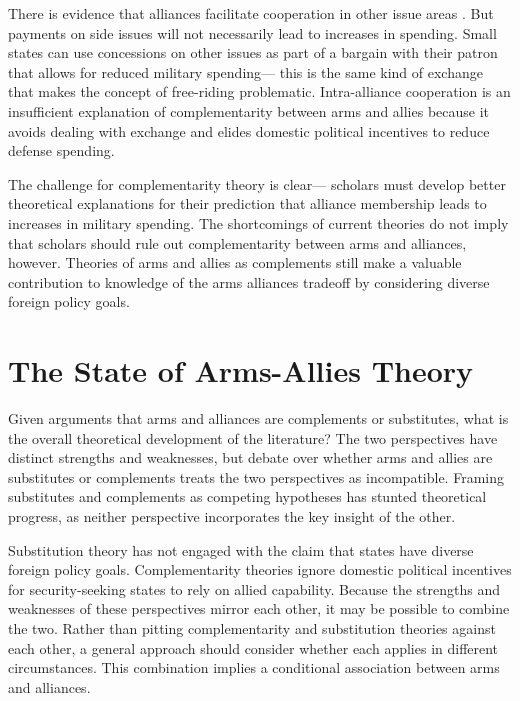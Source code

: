 \documentclass[12pt]{article}
\begin{document}
There is evidence that alliances facilitate cooperation in other issue areas \citep{Gowa1995, GowaMansfield2004, Poast2012, Poast2013}. But payments on side issues will not necessarily lead to increases in spending. Small states can use concessions on other issues as part of a bargain with their patron that allows for reduced military spending--- this is the same kind of exchange that makes the concept of free-riding problematic. Intra-alliance cooperation is an insufficient explanation of complementarity between arms and allies because it avoids dealing with exchange and elides domestic political incentives to reduce defense spending. 

The challenge for complementarity theory is clear--- scholars must develop better theoretical explanations for their prediction that alliance membership leads to increases in military spending. The shortcomings of current theories do not imply that scholars should rule out complementarity between arms and alliances, however. Theories of arms and allies as complements still make a valuable contribution to knowledge of the arms alliances tradeoff by considering diverse foreign policy goals.

\section*{The State of Arms-Allies Theory}

Given arguments that arms and alliances are complements or substitutes, what is the overall theoretical development of the literature? The two perspectives have distinct strengths and weaknesses, but debate over whether arms and allies are substitutes or complements treats the two perspectives as incompatible. Framing substitutes and complements as competing hypotheses has stunted theoretical progress, as neither perspective incorporates the key insight of the other. 

Substitution theory has not engaged with the claim that states have diverse foreign policy goals. Complementarity theories ignore domestic political incentives for security-seeking states to rely on allied capability. Because the strengths and weaknesses of these perspectives mirror each other, it may be possible to combine the two. Rather than pitting complementarity and substitution theories against each other, a general approach should consider whether each applies in different circumstances. This combination implies a conditional association between arms and alliances. 
\end{document}
